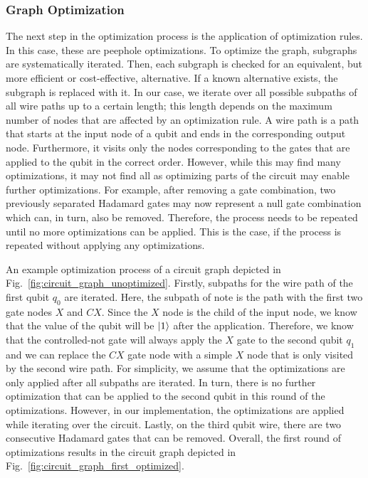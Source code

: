 \subsubsection{Graph Optimization}
The next step in the optimization process is the application of optimization rules. In this case, these are peephole optimizations. To optimize the graph, subgraphs are systematically iterated. Then, each subgraph is checked for an equivalent, but more efficient or cost-effective, alternative. If a known alternative exists, the subgraph is replaced with it. In our case, we iterate over all possible subpaths of all wire paths up to a certain length; this length depends on the maximum number of nodes that are affected by an optimization rule. A wire path is a path that starts at the input node of a qubit and ends in the corresponding output node. Furthermore, it visits only the nodes corresponding to the gates that are applied to the qubit in the correct order. However, while this may find many optimizations, it may not find all as optimizing parts of the circuit may enable further optimizations. For example, after removing a gate combination, two previously separated Hadamard gates may now represent a null gate combination which can, in turn, also be removed. Therefore, the process needs to be repeated until no more optimizations can be applied. This is the case, if the process is repeated without applying any optimizations.

An example optimization process of a circuit graph depicted in Fig.~\ref{fig:circuit_graph_unoptimized}. Firstly, subpaths for the wire path of the first qubit $q_0$ are iterated. Here, the subpath of note is the path with the first two gate nodes $X$ and $CX$. Since the $X$ node is the child of the input node, we know that the value of the qubit will be $\ket{1}$ after the application. Therefore, we know that the controlled-not gate will always apply the $X$ gate to the second qubit $q_1$ and we can replace the $CX$ gate node with a simple $X$ node that is only visited by the second wire path. For simplicity, we assume that the optimizations are only applied after all subpaths are iterated. In turn, there is no further optimization that can be applied to the second qubit in this round of the optimizations. However, in our implementation, the optimizations are applied while iterating over the circuit. Lastly, on the third qubit wire, there are two consecutive Hadamard gates that can be removed. Overall, the first round of optimizations results in the circuit graph depicted in Fig.~\ref{fig:circuit_graph_first_optimized}. 
 
